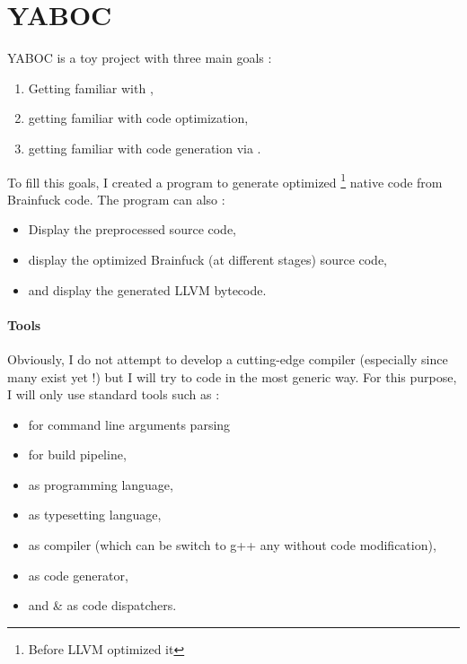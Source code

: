 \section{YABOC}%
\gls{YABOC} is a toy project with three main goals :
\begin{enumerate}
        \item Getting familiar with ,
        \item getting familiar with code optimization,
        \item getting familiar with code generation via .
\end{enumerate}

\newpar To fill this goals, I created a program to generate optimized
\footnote{Before LLVM optimized it} native code from Brainfuck code.
The program can also :
\begin{itemize}
        \item Display the preprocessed \brainfuck 
        source code,
        \item display the optimized Brainfuck (at different stages) source code,
        \item and display the generated LLVM bytecode.
\end{itemize}

\paragraph{Tools} 
Obviously, I do not attempt to develop a cutting-edge \brainfuck compiler
(especially since many exist yet !) but I will try to code in the most generic 
way. For this purpose, I will only use standard tools such as :
\begin{itemize}
        \item {} for command line arguments parsing
        \item {} for build pipeline,
        \item {} as programming language,
        \item \tbf{\LaTeX} as typesetting language,
        \item {} as compiler (which can be switch to g++ 
                any without code modification),
        \item {} as code generator,
        \item and  \&  as code dispatchers.
\end{itemize}

